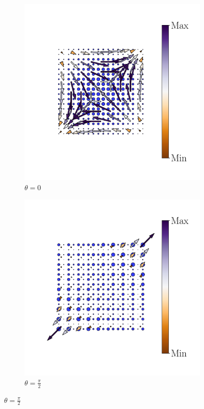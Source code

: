 \begin{figure}[h!]
\begin{minipage}[h!]{1.1\textwidth}
\begin{subfigure}[b!]{0.2 \textwidth}
         \end{subfigure}\hspace*{-0.5em}
          \begin{subfigure}[b!]{0.2 \textwidth}
             \caption*{$\theta = 0$}
             \includegraphics[width=\textwidth]{Imagenes/Resultados_pump_Cuadrado/xy/hoti_pomp_xy_pos3.pdf}
         \end{subfigure}\hspace*{-0.5em}
          \begin{subfigure}[b!]{0.2 \textwidth}
             \caption*{$\theta = \frac{\pi}{2}$}
             \includegraphics[width=\textwidth]{Imagenes/Resultados_pump_Cuadrado/xy/hoti_pomp_xy_pos4.pdf}

\end{subfigure}
\end{minipage}
\end{figure}
